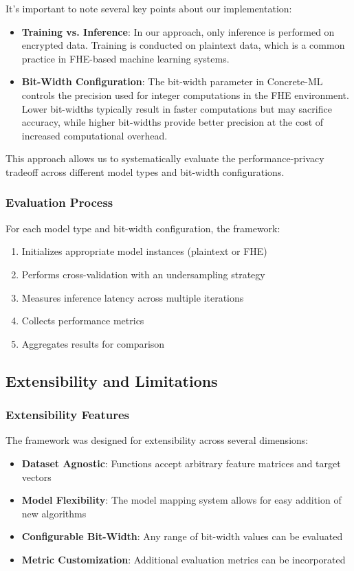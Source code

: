\documentclass[a4paper,12pt]{article}
\begin{document}
It's important to note several key points about our implementation:

\begin{itemize}
    \item \textbf{Training vs. Inference}: In our approach, only inference is performed on encrypted data. Training is conducted on plaintext data, which is a common practice in FHE-based machine learning systems.    
    \item \textbf{Bit-Width Configuration}: The bit-width parameter in Concrete-ML controls the precision used for integer computations in the FHE environment. Lower bit-widths typically result in faster computations but may sacrifice accuracy, while higher bit-widths provide better precision at the cost of increased computational overhead.
\end{itemize}

This approach allows us to systematically evaluate the performance-privacy tradeoff across different model types and bit-width configurations.

\subsubsection{Evaluation Process}
For each model type and bit-width configuration, the framework:

\begin{enumerate}
    \item Initializes appropriate model instances (plaintext or FHE)
    \item Performs cross-validation with an undersampling strategy
    \item Measures inference latency across multiple iterations
    \item Collects performance metrics
    \item Aggregates results for comparison
\end{enumerate}

\subsection{Extensibility and Limitations}

\subsubsection{Extensibility Features}
The framework was designed for extensibility across several dimensions:

\begin{itemize}
    \item \textbf{Dataset Agnostic}: Functions accept arbitrary feature matrices and target vectors
    \item \textbf{Model Flexibility}: The model mapping system allows for easy addition of new algorithms
    \item \textbf{Configurable Bit-Width}: Any range of bit-width values can be evaluated
    \item \textbf{Metric Customization}: Additional evaluation metrics can be incorporated
\end{itemize}
\end{document}
